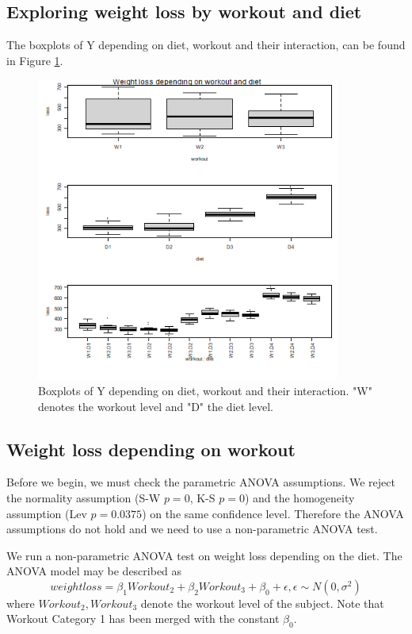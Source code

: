 \documentclass[12pt, a4paper]{article}
\begin{document}
	
	\subsection{Exploring weight loss by workout and diet}
	
	The boxplots of Y depending on diet, workout and their interaction, can be found in Figure \ref{fig::boxplot_2}.
	
	\begin{figure}
		\includegraphics[width=10cm]{boxplot_2.png}
		\centering
		\caption{Boxplots of Y depending on diet, workout and their interaction. "W" denotes the workout level and "D" the diet level.}
		\label{fig::boxplot_2}
	\end{figure}
	
	
	\subsection{Weight loss depending on workout}
	
	Before we begin, we must check the parametric ANOVA assumptions. We reject the normality assumption (S-W $p=0$, K-S $p=0$) and the homogeneity assumption (Lev $p=0.0375$) on the same confidence level. Therefore the ANOVA assumptions do not hold and we need to use a non-parametric ANOVA test.

	We run a non-parametric ANOVA test on weight loss depending on the diet. The ANOVA model may be described as $$
	weightloss = \beta_1 Workout_2 + \beta_2 Workout_3 + \beta_0 + \epsilon, \epsilon \sim N(0, \sigma^2)
	$$
	where $Workout_2, Workout_3$ denote the workout level of the subject. Note that Workout Category 1 has been merged with the constant $\beta_0$.
	
\end{document}
